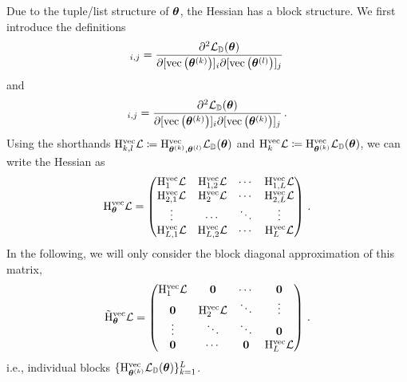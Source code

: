 Due to the tuple/list structure of ${\bm{\theta}}$, the Hessian has a block structure.
We first introduce the definitions
\begin{align*}
  [\hess_{\vtheta^{(k)}, \vtheta^{(l)}}^{\vec} \gL_{\sD}(\vtheta)]_{i,j}
  =
  \frac{\partial^2 \gL_{\sD}(\vtheta)}{\partial [\vec\left(\vtheta^{(k)}\right)]_i \partial [\vec\left(\vtheta^{(l)}\right)]_j}\,
\end{align*}
and
\begin{align*}
  [\hess_{\vtheta^{(k)}}^{\vec} \gL_{\sD}(\vtheta)]_{i,j}
  =
  \frac{\partial^2 \gL_{\sD}(\vtheta)}{\partial [\vec\left(\vtheta^{(k)}\right)]_i \partial [\vec\left(\vtheta^{(k)}\right)]_j}\,.
\end{align*}
Using the shorthands $\mathrm{H}_{k,l}^{\operatorname{vec}} {\mathcal{L}} \coloneq \mathrm{H}_{{\bm{\theta}}^{(k)}, {\bm{\theta}}^{(l)}}^{\operatorname{vec}} {\mathcal{L}}_{{\mathbb{D}}}({\bm{\theta}})$
and $\mathrm{H}_{k}^{\operatorname{vec}} {\mathcal{L}} \coloneq \mathrm{H}_{{\bm{\theta}}^{(k)}}^{\operatorname{vec}} {\mathcal{L}}_{{\mathbb{D}}}({\bm{\theta}})$, we can write the Hessian as
\begin{align*}
  \mathrm{H}_{{\bm{\theta}}}^{\operatorname{vec}} {\mathcal{L}}
  =
  \begin{pmatrix}
    \mathrm{H}_1^{\operatorname{vec}} {\mathcal{L}}
    &
      \mathrm{H}_{1, 2}^{\operatorname{vec}} {\mathcal{L}}
    &
      \cdots
    &
      \mathrm{H}_{1, L}^{\operatorname{vec}} {\mathcal{L}}
    \\
    \mathrm{H}_{2, 1}^{\operatorname{vec}} {\mathcal{L}}
    &
      \mathrm{H}_2^{\operatorname{vec}} {\mathcal{L}}
    &
      \cdots
    &
      \mathrm{H}_{2, L}^{\operatorname{vec}} {\mathcal{L}}
    \\
    \vdots & \cdots & \ddots & \vdots
    \\
    \mathrm{H}_{L, 1}^{\operatorname{vec}} {\mathcal{L}}
    &
      \mathrm{H}_{L, 2}^{\operatorname{vec}} {\mathcal{L}}
    &
      \cdots
    &
      \mathrm{H}_L^{\operatorname{vec}} {\mathcal{L}}
  \end{pmatrix}\,.
\end{align*}
In the following, we will only consider the block diagonal approximation of this matrix,
\begin{align*}
  \tilde{\mathrm{H}}_{{\bm{\theta}}}^{\operatorname{vec}} {\mathcal{L}}
  =
  \begin{pmatrix}
    \mathrm{H}_1^{\operatorname{vec}} {\mathcal{L}} & {\bm{0}} & \cdots & {\bm{0}}
    \\
    {\bm{0}} & \mathrm{H}_2^{\operatorname{vec}} {\mathcal{L}} & \ddots & \vdots
    \\
    \vdots & \ddots & \ddots & {\bm{0}}
    \\
    {\bm{0}} & \cdots & {\bm{0}} & \mathrm{H}_L^{\operatorname{vec}} {\mathcal{L}}
  \end{pmatrix}\,.
\end{align*}
i.e., individual blocks $\{ \mathrm{H}_{{\bm{\theta}}^{(k)}}^{\operatorname{vec}} {\mathcal{L}}_{{\mathbb{D}}}({\bm{\theta}})\}_{k=1}^L$.
